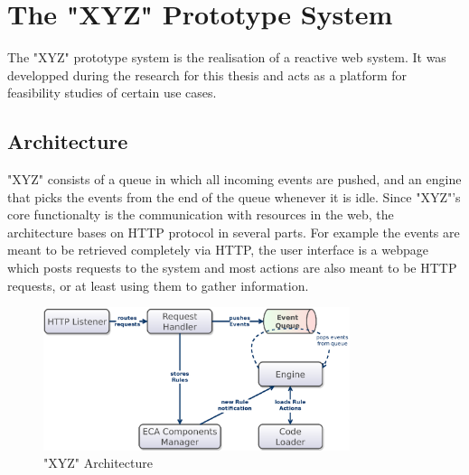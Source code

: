 
\chapter{The "XYZ" Prototype System}
%

% 
The "XYZ" prototype system is the realisation of a reactive web system.
It was developped during the research for this thesis and acts as a platform for feasibility studies of certain use cases.




\section{Architecture}
"XYZ" consists of a queue in which all incoming events are pushed, and an engine that picks the events from the end of the queue whenever it is idle.
Since "XYZ"'s core functionalty is the communication with resources in the web, the architecture bases on HTTP protocol in several parts.
For example the events are meant to be retrieved completely via HTTP, the user interface is a webpage which posts requests to the system and most actions are also meant to be HTTP requests, or at least using them to gather information.

\begin{figure}[!ht]
	\centering
  \includegraphics[width=0.8\textwidth]{figures/Architecture_woET}
	\caption{"XYZ" Architecture}
	\label{fig:Architecture_woEP}
\end{figure}

